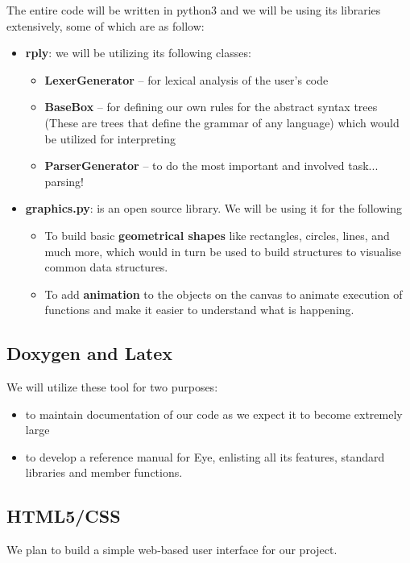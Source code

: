 \documentclass{article}
\begin{document}
The entire code will be written in python3 and we will be using its libraries extensively, some of which are as follow:
\begin{itemize}
\item {\bf rply}: we will be utilizing its following classes:

\begin{itemize}
\item {\bf LexerGenerator} – for lexical analysis of the user's code
\item {\bf BaseBox} – for defining our own rules for the abstract syntax trees (These are trees that define the grammar of any language) which would be utilized for interpreting
\item {\bf ParserGenerator} – to do the most important and involved task... parsing!

\end{itemize}

\item {\bf graphics.py}: is an open source library. We will be using it for the following
\begin{itemize}
\item To build basic {\bf geometrical shapes} like rectangles, circles, lines, and much more, which would in turn be used to build structures to visualise common data structures.
\item To add {\bf animation} to the objects on the canvas to animate execution of functions and make it easier to understand what is happening.
\end{itemize}
\end{itemize}

    
\subsection{Doxygen and Latex}We will utilize these tool for two purposes: 
\begin{itemize}
    \item to maintain documentation of our code as we expect it to become extremely large
    \item to develop a reference manual for Eye, enlisting all its features, standard libraries and member functions.
\end{itemize}

\subsection{HTML5/CSS}
We plan to build a simple web-based user interface for our project.
\end{document}
